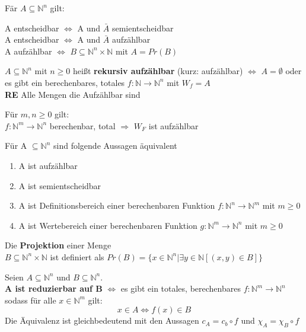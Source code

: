 \documentclass[14pt]{article}
\begin{document}
\begin{eigenschaft}
    Fär $A \subseteq \mathbb{N}^n$ gilt: \\
    \begin{center}
        A entscheidbar $\Leftrightarrow$ A und $\bar{A}$ semientscheidbar \\
        A entscheidbar $\Leftrightarrow$ A und $\bar{A}$ aufzählbar \\
        A aufzählbar $\Leftrightarrow$ $B \subseteq \mathbb{N}^n \times \mathbb{N}$
        mit $A = Pr(B)$
    \end{center}
\end{eigenschaft}
\begin{definition}[Aufzählbarkeit]
    $A \subseteq \mathbb{N}^n$ mit $n \geq 0$ heißt \textbf{rekursiv aufzählbar}
    (kurz: aufzählbar) $\Leftrightarrow$ $A = \emptyset$ oder es gibt ein
    berechenbares, totales $f: \mathbb{N} \rightarrow \mathbb{N}^n$ mit
    $W_f = A$ \\
    \textbf{RE} Alle Mengen die Aufzählbar sind
\end{definition}
\begin{eigenschaft}
    Für $m, n \geq 0$ gilt: \\
    \indent $f: \mathbb{N}^m \rightarrow \mathbb{N}^n$ berechenbar, total
    $\Rightarrow$ $W_F$ ist aufzählbar
\end{eigenschaft}
\begin{eigenschaft}
    Für A $\subseteq \mathbb{N}^n$ sind folgende Aussagen äquivalent
    \begin{enumerate}
        \item A ist aufzählbar
        \item A ist semientscheidbar
        \item A ist Definitionsbereich einer berechenbaren Funktion
              $f: \mathbb{N}^n \rightarrow \mathbb{N}^m$ mit $m \geq 0$
        \item A ist Wertebereich einer berechenbaren Funktion
              $g: \mathbb{N}^m \rightarrow \mathbb{N}^n$ mit $m \geq 0$
    \end{enumerate}
\end{eigenschaft}
\begin{definition}[Projektion]
    Die \textbf{Projektion} einer Menge \\
    $B \subseteq \mathbb{N}^n \times \mathbb{N}$ ist definiert als $Pr(B) =
        \{ x \in \mathbb{N}^n | \exists y \in \mathbb{N}[(x, y) \in B ]\}$
\end{definition}
\begin{definition}[Reduzierbarkeit]
    Seien $A \subseteq \mathbb{N}^n$ und $B \subseteq \mathbb{N}^n$. \\
    \textbf{A ist reduzierbar auf B} $\Leftrightarrow$ es gibt ein totales,
    berechenbares $f: \mathbb{N}^m \rightarrow \mathbb{N}^n$ sodass für
    alle $x \in \mathbb{N}^m$ gilt:
    \[
        x \in A \Leftrightarrow f(x) \in B
    \]
    Die Äquivalenz ist gleichbedeutend mit den Aussagen $c_A = c_b \circ
        f$ und $\chi_A = \chi_B \circ f$
\end{definition}
\end{document}
